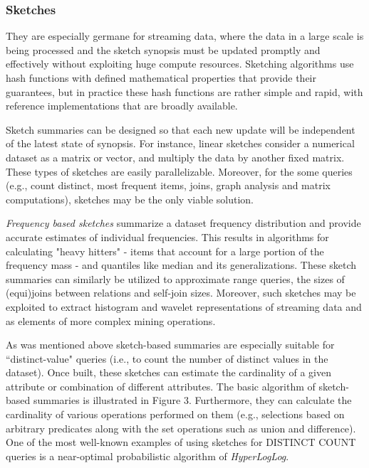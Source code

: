 \documentclass[10pt, conference, compsocconf]{IEEEtran}
\begin{document}
\subsubsection{\textbf{Sketches}}

They are especially germane for streaming data, where the data in a large scale is being processed and the sketch synopsis must be updated promptly and effectively without exploiting huge compute resources. Sketching algorithms use hash functions with defined mathematical properties that provide their guarantees, but in practice these hash functions are rather simple and rapid, with reference implementations that are broadly available.  

Sketch summaries can be designed so that each new update will be independent of the latest state of synopsis. For instance, linear sketches consider a numerical dataset as a matrix or vector, and multiply the data by another fixed matrix. These types of sketches are easily parallelizable. Moreover, for the some queries (e.g., count distinct, most frequent items, joins, graph analysis and matrix computations), sketches may be the only viable solution.

\textit{Frequency based sketches} summarize a dataset frequency distribution and provide accurate estimates of individual frequencies. This results in algorithms for calculating "heavy hitters" - items that account for a large portion of the frequency mass - and quantiles like median and its generalizations. These sketch summaries can similarly be utilized to approximate range queries, the sizes of (equi)joins between relations and self-join sizes. Moreover, such sketches may be exploited to extract histogram and wavelet representations of streaming data and as elements of more complex mining operations.

As was mentioned above sketch-based summaries are especially suitable for ``distinct-value" queries (i.e., to count the number of distinct values in the dataset). Once built, these sketches can estimate the cardinality of a given attribute or combination of different attributes. The basic algorithm of sketch-based summaries is illustrated in Figure 3. Furthermore, they can calculate the cardinality of various operations performed on them (e.g., selections based on arbitrary predicates along with the set operations such as union and difference). One of the most well-known examples of using sketches for DISTINCT COUNT queries is a near-optimal probabilistic algorithm of \textit{HyperLogLog}. 
\end{document}
